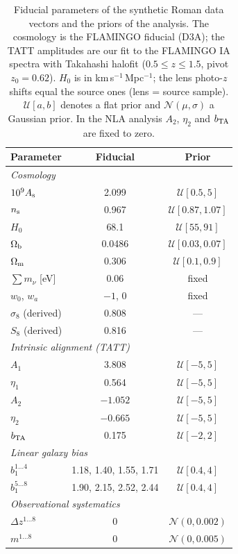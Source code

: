 \begin{table}
\centering
\caption{Fiducial parameters of the synthetic Roman data vectors and the
priors of the analysis. The cosmology is the FLAMINGO fiducial (D3A); the
TATT amplitudes are our fit to the FLAMINGO IA spectra with Takahashi
halofit ($0.5 \le z \le 1.5$, pivot $z_0 = 0.62$). $H_0$ is in
km\,s$^{-1}$\,Mpc$^{-1}$; the lens photo-$z$ shifts equal the source ones
(lens = source sample). $\mathcal{U}[a,b]$ denotes
a flat prior and $\mathcal{N}(\mu,\sigma)$ a Gaussian prior. In the NLA
analysis $A_2$, $\eta_2$ and $b_{\rm TA}$ are fixed to zero.}
\label{tab:fiducial}
\footnotesize
\setlength{\tabcolsep}{5pt}
\begin{tabular}{@{}lcc@{}}
\hline\hline
Parameter & Fiducial & Prior \\
\hline
\multicolumn{3}{l}{\textit{Cosmology}} \\
$10^9 A_{\rm s}$          & 2.099   & $\mathcal{U}[0.5, 5]$ \\
$n_{\rm s}$               & 0.967   & $\mathcal{U}[0.87, 1.07]$ \\
$H_0$                     & 68.1    & $\mathcal{U}[55, 91]$ \\
$\Omega_{\rm b}$          & 0.0486  & $\mathcal{U}[0.03, 0.07]$ \\
$\Omega_{\rm m}$          & 0.306   & $\mathcal{U}[0.1, 0.9]$ \\
$\sum m_\nu$ [eV]         & 0.06    & fixed \\
$w_0$, $w_a$              & $-1$, 0 & fixed \\
$\sigma_8$ (derived)      & 0.808   & --- \\
$S_8$ (derived)           & 0.816   & --- \\
\hline
\multicolumn{3}{l}{\textit{Intrinsic alignment (TATT)}} \\
$A_1$                     & 3.808   & $\mathcal{U}[-5, 5]$ \\
$\eta_1$                  & 0.564   & $\mathcal{U}[-5, 5]$ \\
$A_2$                     & $-1.052$ & $\mathcal{U}[-5, 5]$ \\
$\eta_2$                  & $-0.665$ & $\mathcal{U}[-5, 5]$ \\
$b_{\rm TA}$              & 0.175   & $\mathcal{U}[-2, 2]$ \\
\hline
\multicolumn{3}{l}{\textit{Linear galaxy bias}} \\
$b_1^{1\ldots4}$ & 1.18, 1.40, 1.55, 1.71 & $\mathcal{U}[0.4, 4]$ \\
$b_1^{5\ldots8}$ & 1.90, 2.15, 2.52, 2.44 & $\mathcal{U}[0.4, 4]$ \\
\hline
\multicolumn{3}{l}{\textit{Observational systematics}} \\
$\Delta z^{1\ldots8}$     & 0       & $\mathcal{N}(0, 0.002)$ \\
$m^{1\ldots8}$            & 0       & $\mathcal{N}(0, 0.005)$ \\
\hline\hline
\end{tabular}
\end{table}
